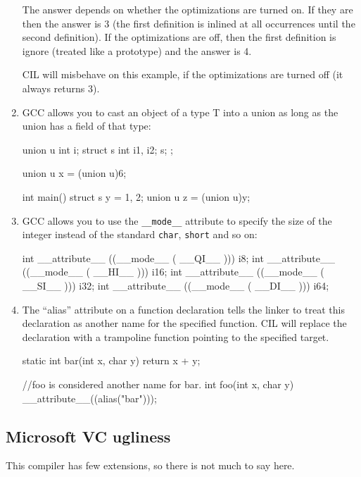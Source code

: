 \documentclass{article}
\def\t#1{{\tt #1}}
\begin{document}
\begin{enumerate}
 The answer depends on whether the optimizations are turned on. If they are
then the answer is 3 (the first definition is inlined at all occurrences until
the second definition). If the optimizations are off, then the first
definition is ignore (treated like a prototype) and the answer is 4. 

 CIL will misbehave on this example, if the optimizations are turned off (it
 always returns 3).

\item GCC allows you to cast an object of a type T into a union as long as the
union has a field of that type:
\begin{cilcode}[global]
union u { 
   int i; 
   struct s { 
      int i1, i2;
   } s;
};

union u x = (union u)6;

int main() {
  struct s y = {1, 2};
  union u  z = (union u)y;
}
\end{cilcode}

\item GCC allows you to use the \t{\_\_mode\_\_} attribute to specify the size
of the integer instead of the standard \t{char}, \t{short} and so on:
\begin{cilcode}[global]
int __attribute__ ((__mode__ (  __QI__ ))) i8;
int __attribute__ ((__mode__ (  __HI__ ))) i16;
int __attribute__ ((__mode__ (  __SI__ ))) i32;
int __attribute__ ((__mode__ (  __DI__ ))) i64;
\end{cilcode}

\item The ``alias'' attribute on a function declaration tells the
  linker to treat this declaration as another name for the specified
  function.  CIL will replace the declaration with a trampoline
  function pointing to the specified target.
\begin{cilcode}[global]
    static int bar(int x, char y) {
      return x + y;
    }

    //foo is considered another name for bar.
    int foo(int x, char y) __attribute__((alias("bar")));
\end{cilcode}

\end{enumerate}

 \subsection{Microsoft VC ugliness}

 This compiler has few extensions, so there is not much to say here.
\end{document}
